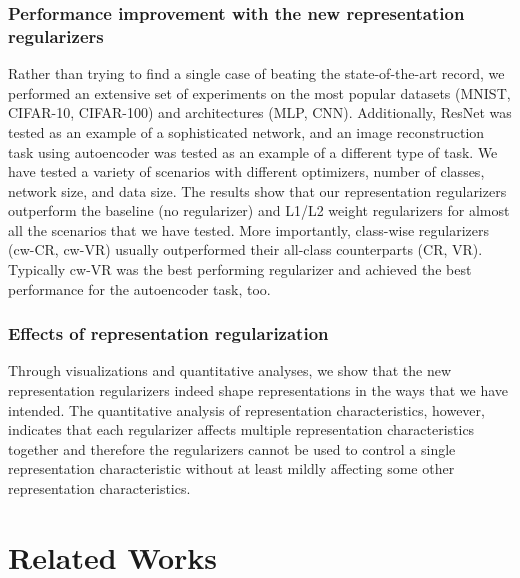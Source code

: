 \documentclass[letterpaper]{article} %
\begin{document}
\subsubsection{Performance improvement with the new representation regularizers}
Rather than trying to find a single case of beating the state-of-the-art record, we performed an extensive set of experiments on the most popular datasets (MNIST, CIFAR-10, CIFAR-100) and architectures (MLP, CNN). Additionally, ResNet \cite{he2016deep} was tested as an example of a sophisticated network, and an image reconstruction task using autoencoder was tested as an example of a different type of task. We have tested a variety of scenarios with different optimizers, number of classes, network size, and data size. The results show that our representation regularizers outperform the baseline (no regularizer) and L1/L2 weight regularizers for almost all the scenarios that we have tested. More importantly, class-wise regularizers (cw-CR, cw-VR) usually outperformed their all-class counterparts (CR, VR). Typically cw-VR was the best performing regularizer and achieved the best performance for the autoencoder task, too.

\subsubsection{Effects of representation regularization}
Through visualizations and quantitative analyses, we show that the new representation regularizers indeed shape representations in the ways that we have intended. The quantitative analysis of representation characteristics, however, indicates that each regularizer affects multiple representation characteristics together and therefore the regularizers cannot be used to control a single representation characteristic without at least mildly affecting some other representation characteristics. 



\section{Related Works}
\end{document}
